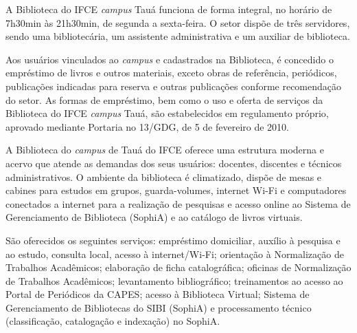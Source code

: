 \documentclass[
	12pt,				%
	openright,			%
	twoside,			%
	a4paper,			%
	chapter=TITLE,		%
	english,			%
	french,				%
	spanish,			%
	brazil,				%
	]{abntex2}
\begin{document}
A Biblioteca do IFCE \textit{campus} Tauá funciona de forma integral, no horário de 7h30min às 21h30min, de segunda a sexta-feira. O setor dispõe de três servidores, sendo uma bibliotecária,  um assistente administrativa e um auxiliar de biblioteca.

Aos usuários vinculados ao \textit{campus} e cadastrados na Biblioteca, é concedido o empréstimo de livros e outros materiais, exceto obras de referência, periódicos, publicações indicadas para reserva e outras publicações conforme recomendação do setor. As formas de empréstimo, bem como o uso e oferta de serviços da Biblioteca do IFCE \textit{campus} Tauá, são estabelecidos em regulamento próprio, aprovado mediante Portaria no 13/GDG, de 5 de fevereiro de 2010. 

A Biblioteca do \textit{campus} de Tauá do IFCE oferece uma estrutura moderna e acervo que atende as demandas dos seus usuários: docentes, discentes e técnicos administrativos. O ambiente da biblioteca é climatizado, dispõe de mesas e cabines para estudos em grupos, guarda-volumes, internet Wi-Fi e computadores conectados a internet para a realização de pesquisas e acesso online ao Sistema de Gerenciamento de Biblioteca (SophiA) e ao catálogo de livros virtuais.

São oferecidos os seguintes serviços: empréstimo domiciliar, auxílio à pesquisa e ao estudo, consulta local, acesso à internet/Wi-Fi; orientação à Normalização de Trabalhos Acadêmicos; elaboração de ficha catalográfica; oficinas de Normalização de Trabalhos Acadêmicos; levantamento bibliográfico; treinamentos ao acesso ao Portal de Periódicos da CAPES; acesso à Biblioteca Virtual; Sistema de Gerenciamento de Bibliotecas do SIBI (SophiA) e processamento técnico (classificação, catalogação e indexação) no SophiA.
%
%
\end{document}
